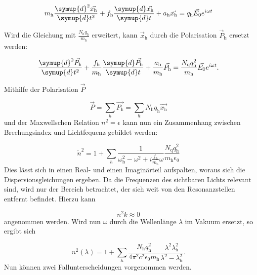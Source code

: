 \begin{equation}
m_{\text{h}} \frac{\symup{d}^2\vec{x_{\text{h}}}}{\symup{d}t^2} + f_{\text{h}}\frac{\symup{d}\vec{x_{\text{h}}}}{\symup{d}t} + a_{\text{h}}\vec{x_{\text{h}}} = q_{\text{h}} \vec{E_0} e^{i \omega t}
\end{equation}

Wird die Gleichung mit $\frac{N_{\text{h}} q_{\text{h}}}{m_{\text{h}}}$ erweitert, kann $\vec{x}_{\text{h}}$ durch die Polarisation $\vec{P}_{\text{h}}$ ersetzt werden:

\begin{equation}
\frac{\symup{d}^2\vec{P_{\text{h}}}}{\symup{d}t^2} + \frac{f_{\text{h}}}{m_{\text{h}}}\frac{\symup{d}\vec{P_{\text{h}}}}{\symup{d}t} + \frac{a_{\text{h}}}{m_{\text{h}}}\vec{P_{\text{h}}} = \frac{N_{\text{q}} q_{\text{h}}^2}{m_{\text{h}}} \vec{E_0} e^{i \omega t}.
\end{equation}

Mithilfe der Polarisation $\vec{P}$

\begin{equation}
\vec{P} = \sum_h \vec{P_{\text{h}}} = \sum_h N_{\text{h}} q_{\text{h}} \vec{x_{\text{h}}}
\end{equation}
und der Maxwellschen Relation $n^2 = \epsilon$  kann nun ein Zusammenhang zwischen Brechungsindex und Lichtfequenz gebildet werden:

\begin{equation}
\tilde{n}^2 = 1 + \sum_h \frac{1}{\omega_{\text{h}}^2 - \omega^2 + i \frac{f_{\text{h}}}{m_{\text{h}}} \omega} \frac{N_{\text{q}} q_{\text{h}}^2}{m_{\text{h}} \epsilon_0}
\end{equation}
Dies lässt sich in einen Real- und einen Imaginärteil aufspalten, woraus sich die Dispersionsgleichungen ergeben. Da die Frequenzen des sichtbaren Lichts relevant sind, wird nur der Bereich betrachtet, der sich weit von den Resonanzstellen entfernt befindet. Hierzu kann 

\begin{equation*}
n^2k \approx 0
\end{equation*}
angenommen werden. Wird nun $\omega$ durch die Wellenlänge $\lambda$ im Vakuum ersetzt, so ergibt sich

\begin{equation}
n^2(\lambda) = 1 + \sum_h \frac{N_{\text{h}} q_{\text{h}}^2}{4\pi^2 c^2 \epsilon_0 m_{\text{h}}} \frac{\lambda^2 \lambda_{\text{h}}^2}{\lambda^2 - \lambda_{\text{h}}^2}.
\label{eq:nquadrat}
\end{equation}
Nun können zwei Fallunterscheidungen vorgenommen werden.







